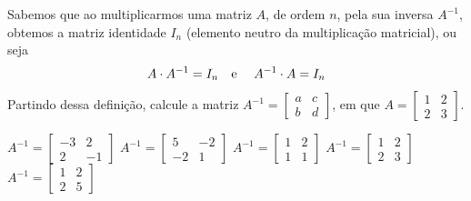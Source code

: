 Sabemos que ao multiplicarmos uma matriz $A$, de ordem $n$, pela sua inversa $A^{-1}$, obtemos a matriz identidade $I_n$ (elemento neutro da multiplicação matricial), ou seja
\[A\cdot A^{-1}=I_n\textnormal{\quad e \quad}A^{-1}\cdot A=I_n \]
Partindo dessa definição, calcule a matriz $A^{-1}=\left[ \begin{array}{cc}
a   &  c \\
b   &  d
\end{array} \right]$, em que $A = \left[ \begin{array}{cc}
1   &  2 \\
2   &  3
\end{array} \right]$.

$A^{-1} = \left[ \begin{array}{cc} -3  &  2\\ 2  & -1 \end{array} \right]$
$A^{-1} = \left[ \begin{array}{cc} 5  & -2\\ -2  &  1 \end{array} \right]$
$A^{-1} = \left[ \begin{array}{cc} 1   &  2\\ 1  &   1 \end{array} \right]$
$A^{-1} = \left[ \begin{array}{cc} 1  &  2\\ 2  &  3 \end{array} \right]$
$A^{-1} = \left[ \begin{array}{cc} 1   &  2\\ 2  &   5 \end{array} \right]$



